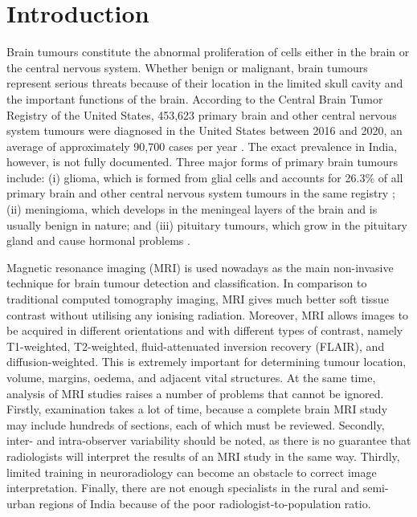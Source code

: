 \documentclass[final,3p,times,number]{elsarticle}
\begin{document}
\section{Introduction}
\label{sec:intro}

Brain tumours constitute the abnormal proliferation of cells either in the brain or the central nervous system. Whether benign or malignant, brain tumours represent serious threats because of their location in the limited skull cavity and the important functions of the brain. According to the Central Brain Tumor Registry of the United States, 453,623 primary brain and other central nervous system tumours were diagnosed in the United States between 2016 and 2020, an average of approximately 90,700 cases per year \cite{cbtrus}. The exact prevalence in India, however, is not fully documented. Three major forms of primary brain tumours include: (i) glioma, which is formed from glial cells and accounts for 26.3\% of all primary brain and other central nervous system tumours in the same registry \cite{cbtrus}; (ii) meningioma, which develops in the meningeal layers of the brain and is usually benign in nature; and (iii) pituitary tumours, which grow in the pituitary gland and cause hormonal problems \cite{ref2}.

Magnetic resonance imaging (MRI) is used nowadays as the main non-invasive technique for brain tumour detection and classification. In comparison to traditional computed tomography imaging, MRI gives much better soft tissue contrast without utilising any ionising radiation. Moreover, MRI allows images to be acquired in different orientations and with different types of contrast, namely T1-weighted, T2-weighted, fluid-attenuated inversion recovery (FLAIR), and diffusion-weighted. This is extremely important for determining tumour location, volume, margins, oedema, and adjacent vital structures. At the same time, analysis of MRI studies raises a number of problems that cannot be ignored. Firstly, examination takes a lot of time, because a complete brain MRI study may include hundreds of sections, each of which must be reviewed. Secondly, inter- and intra-observer variability should be noted, as there is no guarantee that radiologists will interpret the results of an MRI study in the same way. Thirdly, limited training in neuroradiology can become an obstacle to correct image interpretation. Finally, there are not enough specialists in the rural and semi-urban regions of India because of the poor radiologist-to-population ratio.
\end{document}
